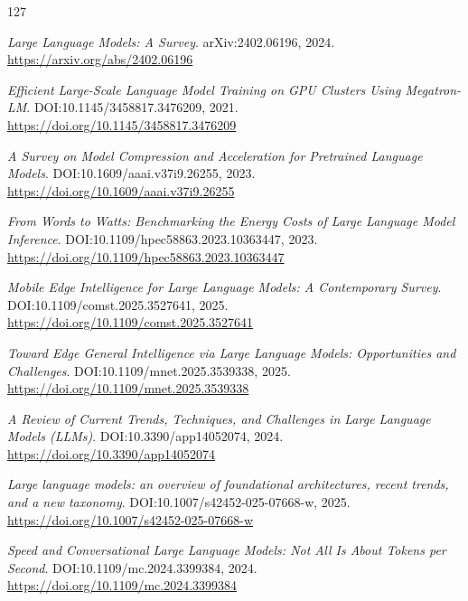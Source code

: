 \documentclass[11pt,a4paper]{article}
\begin{document}
\begin{thebibliography}{127}
\setlength{\itemsep}{2pt}

\newblock \emph{Large Language Models: A Survey}.
\newblock arXiv:2402.06196, 2024.
\newblock \url{https://arxiv.org/abs/2402.06196}

\newblock \emph{Efficient Large-Scale Language Model Training on GPU Clusters Using Megatron-LM}.
\newblock DOI:10.1145/3458817.3476209, 2021.
\newblock \url{https://doi.org/10.1145/3458817.3476209}

\newblock \emph{A Survey on Model Compression and Acceleration for Pretrained Language Models}.
\newblock DOI:10.1609/aaai.v37i9.26255, 2023.
\newblock \url{https://doi.org/10.1609/aaai.v37i9.26255}

\newblock \emph{From Words to Watts: Benchmarking the Energy Costs of Large Language Model Inference}.
\newblock DOI:10.1109/hpec58863.2023.10363447, 2023.
\newblock \url{https://doi.org/10.1109/hpec58863.2023.10363447}

\newblock \emph{Mobile Edge Intelligence for Large Language Models: A Contemporary Survey}.
\newblock DOI:10.1109/comst.2025.3527641, 2025.
\newblock \url{https://doi.org/10.1109/comst.2025.3527641}

\newblock \emph{Toward Edge General Intelligence via Large Language Models: Opportunities and Challenges}.
\newblock DOI:10.1109/mnet.2025.3539338, 2025.
\newblock \url{https://doi.org/10.1109/mnet.2025.3539338}

\newblock \emph{A Review of Current Trends, Techniques, and Challenges in Large Language Models (LLMs)}.
\newblock DOI:10.3390/app14052074, 2024.
\newblock \url{https://doi.org/10.3390/app14052074}

\newblock \emph{Large language models: an overview of foundational architectures, recent trends, and a new taxonomy}.
\newblock DOI:10.1007/s42452-025-07668-w, 2025.
\newblock \url{https://doi.org/10.1007/s42452-025-07668-w}

\newblock \emph{Speed and Conversational Large Language Models: Not All Is About Tokens per Second}.
\newblock DOI:10.1109/mc.2024.3399384, 2024.
\newblock \url{https://doi.org/10.1109/mc.2024.3399384}


\end{thebibliography}
\end{document}
